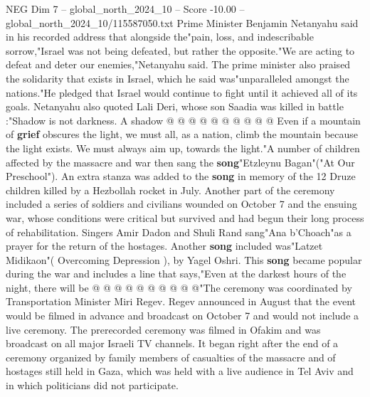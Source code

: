 \begin{textsample}{NEG Dim 7 – global\_north\_2024\_10 – Score -10.00 – global\_north\_2024\_10/115587050.txt}
Prime Minister Benjamin Netanyahu said in his recorded address that alongside the"pain, loss, and indescribable sorrow,"Israel was not being defeated, but rather the opposite."We are acting to defeat and deter our enemies,"Netanyahu said.
The prime minister also praised the solidarity that exists in Israel, which he said was"unparalleled amongst the nations."He pledged that Israel would continue to fight until it achieved all of its goals.
Netanyahu also quoted Lali Deri, whose son Saadia was killed in battle :"Shadow is not darkness.
A shadow @ @ @ @ @ @ @ @ @ @ Even if a mountain of \textbf{grief} obscures the light, we must all, as a nation, climb the mountain because the light exists.
We must always aim up, towards the light."A number of children affected by the massacre and war then sang the \textbf{song}"Etzleynu Bagan"("At Our Preschool").
An extra stanza was added to the \textbf{song} in memory of the 12 Druze children killed by a Hezbollah rocket in July.
Another part of the ceremony included a series of soldiers and civilians wounded on October 7 and the ensuing war, whose conditions were critical but survived and had begun their long process of rehabilitation.
Singers Amir Dadon and Shuli Rand sang"Ana b'Choach"as a prayer for the return of the hostages.
Another \textbf{song} included was"Latzet Midikaon"( Overcoming Depression ), by Yagel Oshri.
This \textbf{song} became popular during the war and includes a line that says,"Even at the darkest hours of the night, there will be @ @ @ @ @ @ @ @ @ @"The ceremony was coordinated by Transportation Minister Miri Regev.
Regev announced in August that the event would be filmed in advance and broadcast on October 7 and would not include a live ceremony.
The prerecorded ceremony was filmed in Ofakim and was broadcast on all major Israeli TV channels.
It began right after the end of a ceremony organized by family members of casualties of the massacre and of hostages still held in Gaza, which was held with a live audience in Tel Aviv and in which politicians did not participate.

\end{textsample}
